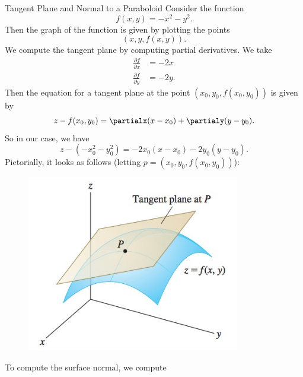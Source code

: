                                         \begin{ex}{Tangent Plane and Normal to a Paraboloid}
                                        Consider the function 
                                        \[
                                        f(x,y)=-x^2-y^2.
                                        \]
                                        Then the graph of the function is given by plotting the points
                                        \[
                                        (x,y,f(x,y)).
                                        \]
                                        We compute the tangent plane by computing partial derivatives. We take
                                        \begin{align*}
                                        \frac{\partial f}{\partial x} &= -2x\\    
                                        \frac{\partial f}{\partial y} &= -2y.
                                        \end{align*}
                                        Then the equation for a tangent plane at the point $(x_0,y_0,f(x_0,y_0))$ is given by
                                        \[
                                        z-f(x_0,y_0)=\partialx (x-x_0)+\partialy (y-y_0).
                                        \]
                                        So in our case, we have
                                        \[
                                        z-(-x_0^2-y_0^2)=-2x_0(x-x_0)-2y_0(y-y_0).
                                        \]
                                        Pictorially, it looks as follows (letting $p=(x_0,y_0,f(x_0,y_0))$):
                                        \begin{figure}[H]
                                            \centering
                                            \includegraphics[width=.4\textwidth]{Figures_Part_6/tangent-planes-1.png}
                                        \end{figure}
                                        To compute the surface normal, we compute

\end{ex}
